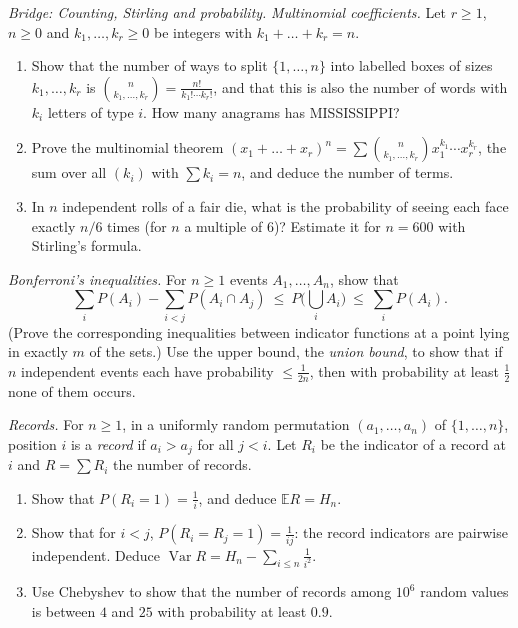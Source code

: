 \begin{exercise}[$\star\star$]\label{ex:multinomial}
\emph{Bridge: Counting, Stirling and probability.}
\emph{Multinomial coefficients.} Let $r\ge1$, $n\ge0$ and $k_1,\ldots,k_r\ge0$ be integers with $k_1+\dots+k_r=n$.
\begin{enumerate}[label=(\alph*)]
\item Show that the number of ways to split $\{1,\dots,n\}$ into labelled boxes of sizes $k_1,\dots,k_r$ is $\binom n{k_1,\dots,k_r}=\frac{n!}{k_1!\cdots k_r!}$, and that this is also the number of words with $k_i$ letters of type $i$. How many anagrams has MISSISSIPPI?
\item Prove the multinomial theorem $(x_1+\dots+x_r)^n=\sum\binom n{k_1,\dots,k_r}x_1^{k_1}\cdots x_r^{k_r}$, the sum over all $(k_i)$ with $\sum k_i=n$, and deduce the number of terms.
\item In $n$ independent rolls of a fair die, what is the probability of seeing each face exactly $n/6$ times (for $n$ a multiple of $6$)? Estimate it for $n=600$ with Stirling's formula.
\end{enumerate}
\end{exercise}

\begin{exercise}[$\star\star$]\label{ex:bonferroni}
\emph{Bonferroni's inequalities.} For $n\ge1$ events $A_1,\dots,A_n$, show that
\[
\sum_iP(A_i)-\sum_{i<j}P(A_i\cap A_j)\ \le\ P\Big(\bigcup_iA_i\Big)\ \le\ \sum_iP(A_i).
\]
(Prove the corresponding inequalities between indicator functions at a point lying in exactly $m$ of the sets.) Use the upper bound, the \emph{union bound}, to show that if $n$ independent events each have probability $\le\frac1{2n}$, then with probability at least $\frac12$ none of them occurs.
\end{exercise}

\begin{exercise}[$\star\star$]\label{ex:records}
\emph{Records.} For $n\ge1$, in a uniformly random permutation $(a_1,\dots,a_n)$ of $\{1,\dots,n\}$, position $i$ is a \emph{record} if $a_i>a_j$ for all $j<i$. Let $R_i$ be the indicator of a record at $i$ and $R=\sum R_i$ the number of records.
\begin{enumerate}[label=(\alph*)]
\item Show that $P(R_i=1)=\frac1i$, and deduce $\mathbb ER=H_n$.
\item Show that for $i<j$, $P(R_i=R_j=1)=\frac1{ij}$: the record indicators are pairwise independent. Deduce $\operatorname{Var}R=H_n-\sum_{i\le n}\frac1{i^2}$.
\item Use Chebyshev to show that the number of records among $10^6$ random values is between $4$ and $25$ with probability at least $0.9$.
\end{enumerate}
\end{exercise}


